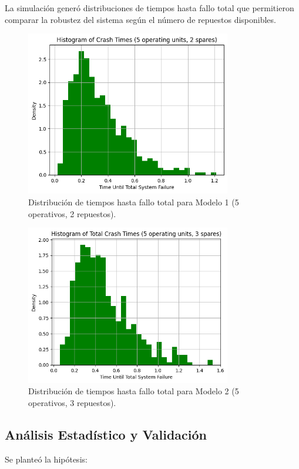 \documentclass{article}
\begin{document}
La simulación generó distribuciones de tiempos hasta fallo total que permitieron comparar la robustez del sistema según el número de repuestos disponibles.

\begin{figure}[H]
   \centering
    \includegraphics[width=0.8\textwidth]{images/histogram_crash_times1.png}
   \caption{Distribución de tiempos hasta fallo total para Modelo 1 (5 operativos, 2 repuestos).}
\end{figure}

\begin{figure}[H]
   \centering
   \includegraphics[width=0.8\textwidth]{images/histogram_crash_times2.png}
   \caption{Distribución de tiempos hasta fallo total para Modelo 2 (5 operativos, 3 repuestos).}
\end{figure}

\subsection{Análisis Estadístico y Validación}
Se planteó la hipótesis:
\end{document}
